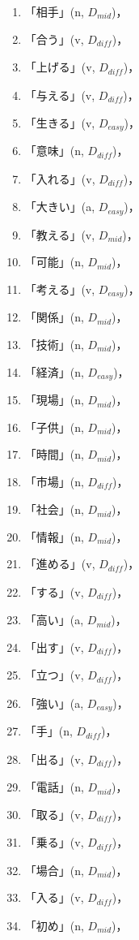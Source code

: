 \documentclass[english]{jnlp_1.4}
\begin{document}
\begin{enumerate}
\item 「相手」(n, $D_{mid}$)，
\item 「合う」(v, $D_{\mathit{diff}}$)，
\item 「上げる」(v, $D_{\mathit{diff}}$)，
\item 「与える」(v, $D_{\mathit{diff}}$)，
\item 「生きる」(v, $D_{easy}$)，
\item 「意味」(n, $D_{\mathit{diff}}$)，
\item 「入れる」(v, $D_{\mathit{diff}}$)，
\item 「大きい」(a, $D_{easy}$)，
\item 「教える」(v, $D_{mid}$)，
\item 「可能」(n, $D_{mid}$)，
\item 「考える」(v, $D_{easy}$)，
\item 「関係」(n, $D_{mid}$)，
\item 「技術」(n, $D_{mid}$)，
\item 「経済」(n, $D_{easy}$)，
\item 「現場」(n, $D_{mid}$)，
\item 「子供」(n, $D_{mid}$)，
\item 「時間」(n, $D_{mid}$)，
\item 「市場」(n, $D_{\mathit{diff}}$)，
\item 「社会」(n, $D_{mid}$)，
\item 「情報」(n, $D_{mid}$)，
\item 「進める」(v, $D_{\mathit{diff}}$)，
\item 「する」(v, $D_{\mathit{diff}}$)，
\item 「高い」(a, $D_{mid}$)，
\item 「出す」(v, $D_{\mathit{diff}}$)，
\item 「立つ」(v, $D_{\mathit{diff}}$)，
\item 「強い」(a, $D_{easy}$)，
\item 「手」(n, $D_{\mathit{diff}}$)，
\item 「出る」(v, $D_{\mathit{diff}}$)，
\item 「電話」(n, $D_{mid}$)，
\item 「取る」(v, $D_{\mathit{diff}}$)，
\item 「乗る」(v, $D_{\mathit{diff}}$)，
\item 「場合」(n, $D_{mid}$)，
\item 「入る」(v, $D_{\mathit{diff}}$)，
\item 「初め」(n, $D_{mid}$)，

\end{enumerate}
\end{document}
